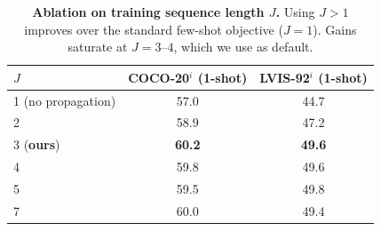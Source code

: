 \begin{table}[h]
\centering
\caption{\textbf{Ablation on training sequence length $J$.} Using $J>1$ improves over the standard few-shot objective ($J=1$). Gains saturate at $J=3$--$4$, which we use as default.}
\vspace{0.5em}
\begin{tabular}{lcc}
\toprule
$J$ & COCO-20$^i$ (1-shot) & LVIS-92$^i$ (1-shot) \\
\midrule
1 (no propagation) & 57.0 & 44.7 \\
2 & 58.9 & 47.2 \\
3 (\textbf{ours}) & \textbf{60.2} & \textbf{49.6} \\
4 & 59.8 & 49.6 \\
5 & 59.5 & 49.8 \\
7 & 60.0 & 49.4 \\
\bottomrule
\end{tabular}
\label{tab:mask_propagation}
\end{table}